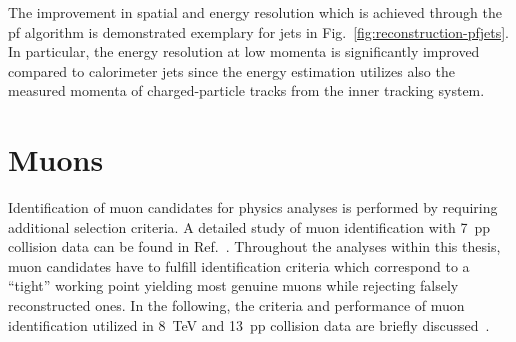 The improvement in spatial and energy resolution which is achieved through the \gls{pf} algorithm is demonstrated exemplary for jets in Fig.~\ref{fig:reconstruction-pfjets}. In particular, the energy resolution at low momenta is significantly improved compared to calorimeter jets since the energy estimation utilizes also the measured momenta of charged-particle tracks from the inner tracking system.


\section{Muons}
\label{sec:reconstruction-muons}

Identification of muon candidates for physics analyses is performed by requiring additional selection criteria. A detailed study of muon identification with 7~\TeV \gls{pp} collision data can be found in Ref.~\cite{Chatrchyan:2012xi}. Throughout the analyses within this thesis, muon candidates have to fulfill identification criteria which correspond to a ``tight'' working point yielding most genuine muons while rejecting falsely reconstructed ones. In the following, the criteria and performance of muon identification utilized in 8~TeV and 13~\TeV \gls{pp} collision data are briefly discussed~\cite{CMS-DP-2013-009,CMS-DP-2017-007}.

